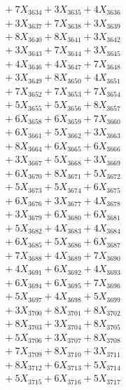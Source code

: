 \documentclass[a4paper,10pt]{article}
\begin{document}
{\begin{align}
&\;  + 7 X_{3634} + 3 X_{3635} + 4 X_{3636} \\[0.3ex]
&\;  + 3 X_{3637} + 7 X_{3638} + 3 X_{3639} \\[0.5ex]\allowbreak
&\;  + 8 X_{3640} + 8 X_{3641} + 3 X_{3642} \\[0.3ex]
&\;  + 3 X_{3643} + 7 X_{3644} + 3 X_{3645} \\[0.3ex]
&\;  + 4 X_{3646} + 4 X_{3647} + 7 X_{3648} \\[0.3ex]
&\;  + 3 X_{3649} + 8 X_{3650} + 4 X_{3651} \\[0.3ex]
&\;  + 7 X_{3652} + 7 X_{3653} + 7 X_{3654} \\[0.3ex]
&\;  + 5 X_{3655} + 5 X_{3656} + 8 X_{3657} \\[0.3ex]
&\;  + 6 X_{3658} + 6 X_{3659} + 7 X_{3660} \\[0.3ex]
&\;  + 6 X_{3661} + 5 X_{3662} + 3 X_{3663} \\[0.3ex]
&\;  + 8 X_{3664} + 6 X_{3665} + 6 X_{3666} \\[0.3ex]
&\;  + 3 X_{3667} + 5 X_{3668} + 3 X_{3669} \\[0.5ex]\allowbreak
&\;  + 6 X_{3670} + 8 X_{3671} + 5 X_{3672} \\[0.3ex]
&\;  + 5 X_{3673} + 5 X_{3674} + 6 X_{3675} \\[0.3ex]
&\;  + 6 X_{3676} + 3 X_{3677} + 4 X_{3678} \\[0.3ex]
&\;  + 3 X_{3679} + 6 X_{3680} + 6 X_{3681} \\[0.3ex]
&\;  + 5 X_{3682} + 4 X_{3683} + 4 X_{3684} \\[0.3ex]
&\;  + 6 X_{3685} + 5 X_{3686} + 6 X_{3687} \\[0.3ex]
&\;  + 7 X_{3688} + 4 X_{3689} + 7 X_{3690} \\[0.3ex]
&\;  + 4 X_{3691} + 6 X_{3692} + 4 X_{3693} \\[0.3ex]
&\;  + 6 X_{3694} + 6 X_{3695} + 7 X_{3696} \\[0.3ex]
&\;  + 5 X_{3697} + 4 X_{3698} + 5 X_{3699} \\[0.5ex]\allowbreak
&\;  + 3 X_{3700} + 8 X_{3701} + 8 X_{3702} \\[0.3ex]
&\;  + 8 X_{3703} + 3 X_{3704} + 8 X_{3705} \\[0.3ex]
&\;  + 5 X_{3706} + 3 X_{3707} + 8 X_{3708} \\[0.3ex]
&\;  + 7 X_{3709} + 8 X_{3710} + 3 X_{3711} \\[0.3ex]
&\;  + 8 X_{3712} + 6 X_{3713} + 5 X_{3714} \\[0.3ex]
&\;  + 5 X_{3715} + 6 X_{3716} + 5 X_{3717} \\[0.3ex]

\end{align}}
\end{document}
